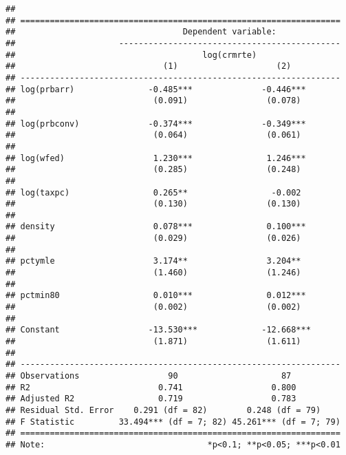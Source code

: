 \documentclass[]{article}
\begin{document}
\begin{verbatim}
## 
## =================================================================
##                                  Dependent variable:             
##                     ---------------------------------------------
##                                      log(crmrte)                 
##                              (1)                    (2)          
## -----------------------------------------------------------------
## log(prbarr)               -0.485***              -0.446***       
##                            (0.091)                (0.078)        
##                                                                  
## log(prbconv)              -0.374***              -0.349***       
##                            (0.064)                (0.061)        
##                                                                  
## log(wfed)                  1.230***               1.246***       
##                            (0.285)                (0.248)        
##                                                                  
## log(taxpc)                 0.265**                 -0.002        
##                            (0.130)                (0.130)        
##                                                                  
## density                    0.078***               0.100***       
##                            (0.029)                (0.026)        
##                                                                  
## pctymle                    3.174**                3.204**        
##                            (1.460)                (1.246)        
##                                                                  
## pctmin80                   0.010***               0.012***       
##                            (0.002)                (0.002)        
##                                                                  
## Constant                  -13.530***             -12.668***      
##                            (1.871)                (1.611)        
##                                                                  
## -----------------------------------------------------------------
## Observations                  90                     87          
## R2                          0.741                  0.800         
## Adjusted R2                 0.719                  0.783         
## Residual Std. Error    0.291 (df = 82)        0.248 (df = 79)    
## F Statistic         33.494*** (df = 7; 82) 45.261*** (df = 7; 79)
## =================================================================
## Note:                                 *p<0.1; **p<0.05; ***p<0.01
\end{verbatim}
\end{document}
